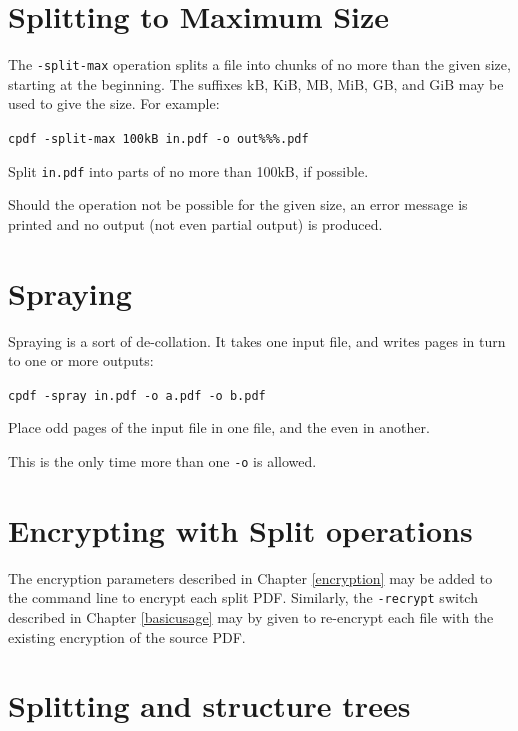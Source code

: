 \documentclass{book}
\begin{document}
\section{Splitting to Maximum Size}

The \texttt{-split-max} operation splits a file into chunks of no more than the given size, starting at the beginning. The suffixes kB, KiB, MB, MiB, GB, and GiB may be used to give the size. For example:

  \begin{framed}\small
    \noindent\verb!cpdf -split-max 100kB in.pdf -o out%%%.pdf!

    \vspace{2.5mm}
    \noindent Split \texttt{in.pdf} into parts of no more than 100kB, if possible.

  \end{framed}
\noindent Should the operation not be possible for the given size, an error message is printed and no output (not even partial output) is produced.

\section{Spraying}

Spraying is a sort of de-collation. It takes one input file, and writes pages in turn to one or more outputs:

  \begin{framed}\small
    \noindent\verb!cpdf -spray in.pdf -o a.pdf -o b.pdf!

    \vspace{2.5mm}
    \noindent Place odd pages of the input file in one file, and the even in another.

  \end{framed}

\noindent This is the only time more than one \texttt{-o} is allowed.

\section{Encrypting with Split operations}
The encryption parameters described in Chapter \ref{encryption} may be added to the command line to encrypt each split PDF. Similarly, the \texttt{-recrypt} switch described in Chapter \ref{basicusage} may by given to re-encrypt each file with the existing encryption of the source PDF.

\section{Splitting and structure trees}
\end{document}
